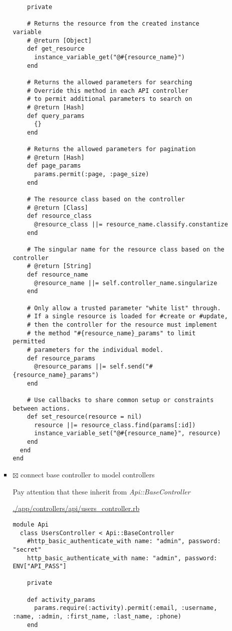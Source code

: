 \documentclass[11pt]{article}
\begin{document}
\begin{itemize}
\begin{itemize}
\begin{itemize}
\begin{verbatim}
    private

    # Returns the resource from the created instance variable
    # @return [Object]
    def get_resource
      instance_variable_get("@#{resource_name}")
    end

    # Returns the allowed parameters for searching
    # Override this method in each API controller
    # to permit additional parameters to search on
    # @return [Hash]
    def query_params
      {}
    end

    # Returns the allowed parameters for pagination
    # @return [Hash]
    def page_params
      params.permit(:page, :page_size)
    end

    # The resource class based on the controller
    # @return [Class]
    def resource_class
      @resource_class ||= resource_name.classify.constantize
    end

    # The singular name for the resource class based on the controller
    # @return [String]
    def resource_name
      @resource_name ||= self.controller_name.singularize
    end

    # Only allow a trusted parameter "white list" through.
    # If a single resource is loaded for #create or #update,
    # then the controller for the resource must implement
    # the method "#{resource_name}_params" to limit permitted
    # parameters for the individual model.
    def resource_params
      @resource_params ||= self.send("#{resource_name}_params")
    end

    # Use callbacks to share common setup or constraints between actions.
    def set_resource(resource = nil)
      resource ||= resource_class.find(params[:id])
      instance_variable_set("@#{resource_name}", resource)
    end
  end
end
\end{verbatim}

\item $\boxtimes$ connect base controller to model controllers

Pay attention that these inherit from \emph{Api::BaseController}

\url{./app/controllers/api/users_controller.rb}

\begin{verbatim}
module Api
  class UsersController < Api::BaseController
    #http_basic_authenticate_with name: "admin", password: "secret"
    http_basic_authenticate_with name: "admin", password: ENV["API_PASS"]

    private

    def activity_params
      params.require(:activity).permit(:email, :username, :name, :admin, :first_name, :last_name, :phone)
    end


\end{verbatim}
\end{itemize}
\end{itemize}
\end{itemize}
\end{document}
